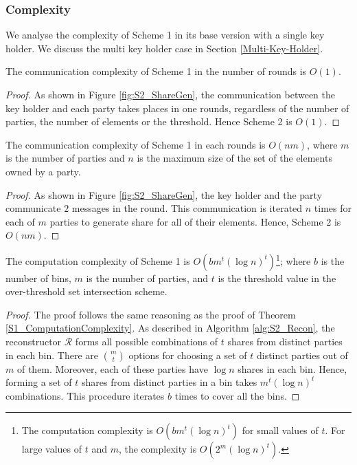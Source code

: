 \subsubsection{Complexity}
We analyse the complexity of Scheme 1 in its base version with a single key holder. We discuss the multi key holder case in Section \ref{Multi-Key-Holder}.
\begin{theorem}
The communication complexity of Scheme 1 in the number of rounds is $O(1)$. 
\end{theorem}
\begin{proof}
As shown in Figure \ref{fig:S2_ShareGen}, the communication between the key holder and each party takes places in one rounds, regardless of the number of parties, the number of elements or the threshold. Hence Scheme 2 is $O(1)$. 
\end{proof}
\begin{theorem}
The communication complexity of Scheme 1 in each rounds is $O(nm)$, where $m$ is the number of parties and $n$ is the maximum size of the set of the elements owned by a party. 
\end{theorem}
\begin{proof}
As shown in Figure \ref{fig:S2_ShareGen}, the key holder and the party communicate $2$ messages in the round. This communication is iterated $n$ times for each of $m$ parties to generate share for all of their elements. Hence, Scheme 2 is $O(nm)$.  
\end{proof}
\begin{theorem}
The computation complexity of Scheme 1 is $O(b m^t (\log{n})^t)$\footnote{The computation complexity is $O(b m^t (\log{n})^t)$ for small values of $t$. For large values of $t$ and $m$, the complexity is $O(2^m (\log{n})^t)$.}; where $b$ is the number of bins, $m$ is the number of parties, and $t$ is the threshold value in the over-threshold set intersection scheme. 
\end{theorem}
\begin{proof}
The proof follows the same reasoning as the proof of Theorem \ref{S1_ComputationComplexity}. 
As described in Algorithm \ref{alg:S2_Recon}, the reconstructor $\mathcal{R}$ forms all possible combinations of $t$ shares from distinct parties in each bin. There are $m \choose t$ options for choosing a set of $t$ distinct parties out of $m$ of them. Moreover, each of these parties have $\log{n}$ shares in each bin. Hence, forming a set of $t$ shares from distinct parties in a bin takes $m^t (\log{n})^t$ combinations. This procedure iterates $b$ times to cover all the bins.  
\end{proof}

